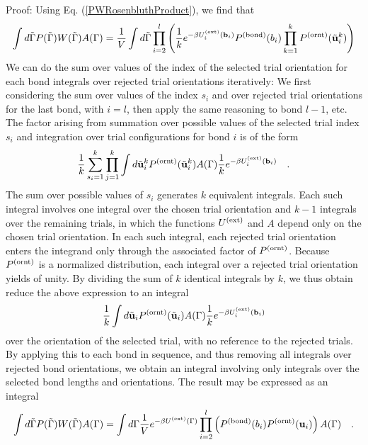 \documentclass[12pt]{article} %
\newcommand{\vv}[1]{\mathbf{#1}}
\newcommand\chain{\Gamma}
\newcommand\Uext{U^{({\rm ext})}}
\newcommand\nbead{l}
\newcommand\vbond{\vv{b}}
\newcommand\ubond{\vv{u}}
\newcommand\rbond{b}
\newcommand\ntrial{k}
\newcommand\utrial{\tilde{\vv{u}}}
\newcommand\Pbond{P^{({\rm bond})}}
\newcommand\Pornt{P^{({\rm ornt})}}
\newcommand\rconfig{\tilde{\chain}}
\begin{document}
Proof: Using Eq. (\ref{PWRosenbluthProduct}), we find that
\begin{equation}
   \int d\rconfig P(\rconfig)W(\rconfig) A(\chain)
   = \frac{1}{V} \int d\rconfig 
    \prod_{i=2}^{\nbead} \left (
     \frac{1}{k} e^{-\beta\Uext_{i}(\vbond_{i})}
                 \Pbond(\rbond_{i})
                 \prod_{k=1}^{\ntrial}
                 \Pornt(\utrial_{i}^{k}) \right )
\end{equation}
We can do the sum over values of the index of the selected trial orientation
for each bond integrals over rejected trial orientations iteratively: We first
considering the sum over values of the index $s_{i}$ and over rejected trial
orientations for the last bond, with $i=\nbead$, then apply the same reasoning 
to bond $\nbead-1$, etc. The factor arising from summation over possible values 
of the selected trial index $s_{i}$ and integration over trial configurations 
for bond $i$ is of the form
\begin{equation}
   \frac{1}{k} \sum_{s_{i}=1}^{\ntrial}
   \prod_{j=1}^{\ntrial} \int d\utrial_{i}^{k} 
   \Pornt(\utrial_{i}^{k}) A(\chain) 
   \frac{1}{k} e^{-\beta\Uext_{i}(\vbond_{i})}
   \quad.
\end{equation}
The sum over possible values of $s_{i}$ generates $k$ equivalent integrals.
Each such integral involves one integral over the chosen trial orientation
and $k-1$ integrals over the remaining trials, in which the functions $\Uext$ 
and $A$ depend only on the chosen trial orientation. In each such integral,
each rejected trial orientation enters the integrand only through the 
associated factor of $\Pornt$. Because $\Pornt$ is a normalized distribution, 
each integral over a rejected trial orientation yields of unity. By dividing
the sum of $k$ identical integrals by $k$, we thus obtain reduce the above
expression to an integral
\begin{equation}
   \frac{1}{k} \int d\utrial_{i} \Pornt(\utrial_{i}) A(\chain) 
   \frac{1}{k} e^{-\beta\Uext_{i}(\vbond_{i})}
\end{equation}
over the orientation of the selected trial, with no reference to the rejected 
trials. By applying this to each bond in sequence, and thus removing all 
integrals over rejected bond orientations, we obtain an integral involving only 
integrals over the selected bond lengths and orientations. The result may be
expressed as an integral
\begin{equation}
    \int d\rconfig P(\rconfig)W(\rconfig) A(\chain) = 
    \int d\chain \frac{1}{V} e^{-\beta\Uext(\chain)}
                 \prod_{i=2}^{\nbead} \left ( \Pbond(\rbond_{i}) \Pornt(\ubond_{i}) \right )
                 A(\chain) \quad.
\end{equation}
\end{document}
